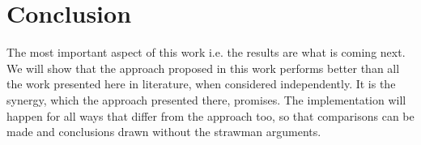 \documentclass[conference]{IEEEtran}
\begin{document}
%






\section{Conclusion}
The most important aspect of this work i.e. the results are what is coming
next. We will show that the approach proposed in this work performs better than
all the work presented here in literature, when considered independently. It is
the synergy, which the approach presented there, promises. The implementation
will happen for all ways that differ from the approach too, so that comparisons
can be made and conclusions drawn without the strawman arguments. 
\end{document}

